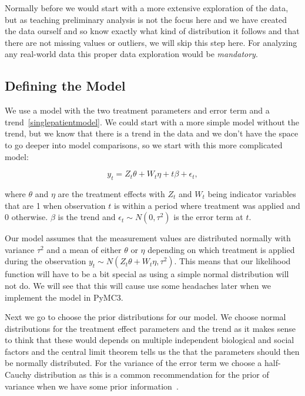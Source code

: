 \documentclass[12pt,a4paper,leqno]{report}
\theoremstyle{plain}
\theoremstyle{definition}
\theoremstyle{remark}
\begin{document}
Normally before we would start with a more extensive exploration of the data, but as teaching preliminary analysis
is not the focus here and we have created the data ourself and so know exactly what kind
of distribution it follows and that there are not missing values or outliers, we will
skip this step here. For analyzing any real-world data this proper data exploration would be \emph{mandatory}.

\subsection{Defining the Model}

We use a model with the two treatment parameters and error term and a trend\ \ref{singlepatientmodel}. We could
start with a more simple model without the trend, but we know that there is a trend in
the data and we don't have the space to go deeper into model comparisons, so we start
with this more complicated model:

\begin{def}\label{}
    \begin{equation}\label{singlepatientmodel}
        y_t = Z_t\theta + W_t\eta + t\beta + \epsilon_t,
    \end{equation}
\end{def}where \(\theta \) and \(\eta \) are the treatment effects with \(Z_t\) and \(W_t\) being indicator
variables that are 1 when observation \(t\) is within a period where treatment was applied and
0 otherwise. \(\beta \) is the trend and \(\epsilon_{t} \sim N(0,\tau^2) \) is the error term at \(t\).

Our model assumes that the measurement values are distributed normally with
variance \(\tau^2\) and a mean of either \(\theta \) or \(\eta \) depending on which
treatment is applied during the observation \(y_t \sim N(Z_t\theta + W_t\eta, \tau^2)\).
This means that our likelihood function will have to be a bit special as using a simple
normal distribution will not do. We will see that this will cause use some headaches
later when we implement the model in PyMC3.

Next we go to choose the prior distributions for our model. We choose
normal distributions for the treatment effect parameters and the trend as it makes sense to think
that these would depends on multiple independent biological and social
factors and the central limit theorem tells us the that
the parameters should then be normally distributed. For the variance of the error
term we choose a half-Cauchy distribution as this is a common recommendation for the
prior of variance when we have some prior information\ \cite{variancepriors}.
\end{document}
